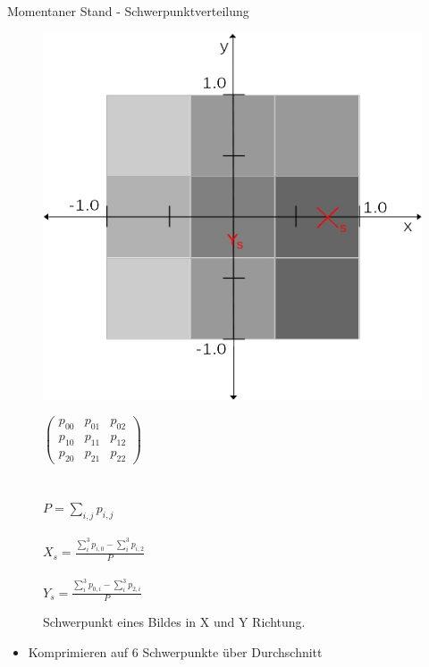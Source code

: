 \documentclass[10pt]{beamer}
\begin{document}
\begin{frame}{Momentaner Stand - Schwerpunktverteilung}
\begin{figure}
    \begin{minipage}[c]{0.4\linewidth}
        \includegraphics[width=\linewidth]{schwerpunkt_ansatz.jpg}
        \caption{Schwerpunkt eines Bildes in X und Y Richtung.}
    \end{minipage}
    \hfill
    \begin{minipage}[c]{0.4\linewidth}
        $\begin{pmatrix}
            p_{00} & p_{01} & p_{02}\\
            p_{10} & p_{11} & p_{12}\\
            p_{20} & p_{21} & p_{22}
        \end{pmatrix}$
        \\\\\\
        $P = \sum_{i,j} p_{i,j}$
        \\\\
        $X_s = \frac{\sum_{i}^{3} p_{i,0} - \sum_{i}^{3} p_{i,2}}{P}$
        \\\\
        $Y_s = \frac{\sum_{i}^{3} p_{0,i} - \sum_{i}^{3} p_{2,i}}{P}$
    \end{minipage}
\end{figure}
\begin{itemize}
    \item Komprimieren auf 6 Schwerpunkte über Durchschnitt
\end{itemize}
\end{frame}
\end{document}
